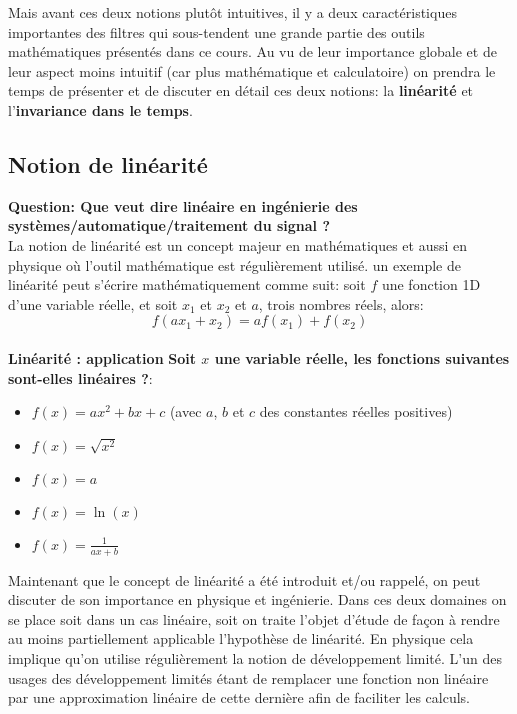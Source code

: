 \documentclass[11pt,a4paper]{article}
\begin{document}
Mais avant ces deux notions plutôt intuitives, il y a deux caractéristiques importantes des filtres qui sous-tendent une grande partie des outils mathématiques présentés dans ce cours. Au vu de leur importance globale et de leur aspect moins intuitif (car plus mathématique et calculatoire) on prendra le temps de présenter et de discuter en détail ces deux notions: la \textbf{linéarité} et l'\textbf{invariance dans le temps}.

\subsection{Notion de linéarité}
\textbf{Question: Que veut dire linéaire en ingénierie des systèmes/automatique/traitement du signal ? \label{linéaire ?} }\\

La notion de linéarité est un concept majeur en mathématiques et aussi en physique où l'outil mathématique est régulièrement utilisé. un exemple de linéarité peut s'écrire mathématiquement comme suit: soit $f$ une fonction 1D d'une variable réelle,  et soit $x_1$ et $x_2$ et $a$, trois nombres réels, alors:\\

\[f(a x_1 + x_2) = a f(x_1) + f(x_2)  \] \\

\textbf{Linéarité : application}
\textbf{Soit $x$ une variable réelle, les fonctions suivantes sont-elles linéaires ?}:
\begin{itemize}
\item $f(x) = a x^2 + b x + c$ (avec $a$, $b$ et $c$ des constantes réelles positives) 
\item $f(x) = \sqrt{x^2}$
\item $f(x) = a$
\item $f(x) = \ln(x)$
\item $f(x) = \frac{1}{a x + b}$
\end{itemize}

Maintenant que le concept de linéarité a été introduit et/ou rappelé, on peut discuter de son importance en physique et ingénierie. Dans ces deux domaines on se place soit dans un cas linéaire, soit on traite l'objet d'étude de façon à rendre au moins partiellement applicable l'hypothèse de linéarité. En physique cela implique qu'on utilise régulièrement la notion de développement limité. L'un des usages des développement limités étant de remplacer une fonction non linéaire par une approximation linéaire de cette dernière afin de faciliter les calculs.\\
\end{document}
